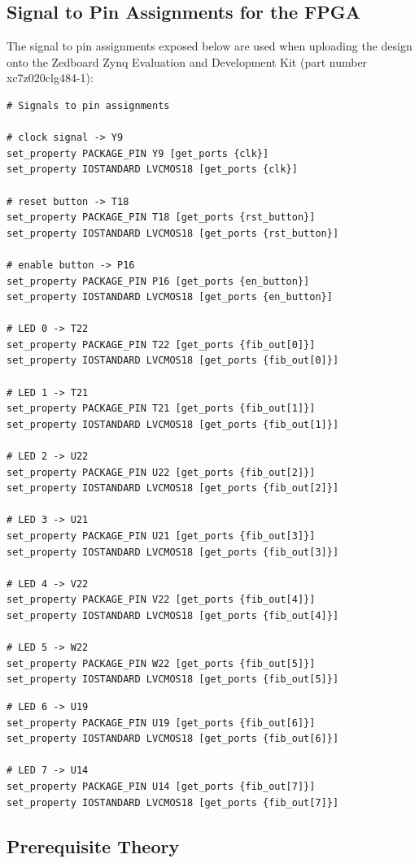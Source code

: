 \documentclass[10pt]{article}
\begin{document}
\subsection {Signal to Pin Assignments for the FPGA}
The signal to pin assignments exposed below are used when uploading the design onto the Zedboard Zynq Evaluation and Development Kit (part number xc7z020clg484-1):
\begin{verbatim}
# Signals to pin assignments

# clock signal -> Y9
set_property PACKAGE_PIN Y9 [get_ports {clk}]
set_property IOSTANDARD LVCMOS18 [get_ports {clk}]

# reset button -> T18
set_property PACKAGE_PIN T18 [get_ports {rst_button}]
set_property IOSTANDARD LVCMOS18 [get_ports {rst_button}]

# enable button -> P16
set_property PACKAGE_PIN P16 [get_ports {en_button}]
set_property IOSTANDARD LVCMOS18 [get_ports {en_button}]

# LED 0 -> T22
set_property PACKAGE_PIN T22 [get_ports {fib_out[0]}]
set_property IOSTANDARD LVCMOS18 [get_ports {fib_out[0]}]

# LED 1 -> T21
set_property PACKAGE_PIN T21 [get_ports {fib_out[1]}]
set_property IOSTANDARD LVCMOS18 [get_ports {fib_out[1]}]

# LED 2 -> U22
set_property PACKAGE_PIN U22 [get_ports {fib_out[2]}]
set_property IOSTANDARD LVCMOS18 [get_ports {fib_out[2]}]

# LED 3 -> U21
set_property PACKAGE_PIN U21 [get_ports {fib_out[3]}]
set_property IOSTANDARD LVCMOS18 [get_ports {fib_out[3]}]

# LED 4 -> V22
set_property PACKAGE_PIN V22 [get_ports {fib_out[4]}]
set_property IOSTANDARD LVCMOS18 [get_ports {fib_out[4]}]

# LED 5 -> W22
set_property PACKAGE_PIN W22 [get_ports {fib_out[5]}]
set_property IOSTANDARD LVCMOS18 [get_ports {fib_out[5]}]
\end{verbatim}
\newpage
\begin{verbatim}
# LED 6 -> U19
set_property PACKAGE_PIN U19 [get_ports {fib_out[6]}]
set_property IOSTANDARD LVCMOS18 [get_ports {fib_out[6]}]

# LED 7 -> U14
set_property PACKAGE_PIN U14 [get_ports {fib_out[7]}]
set_property IOSTANDARD LVCMOS18 [get_ports {fib_out[7]}]
\end{verbatim}
\newpage
\subsection{Prerequisite Theory}
\end{document}

